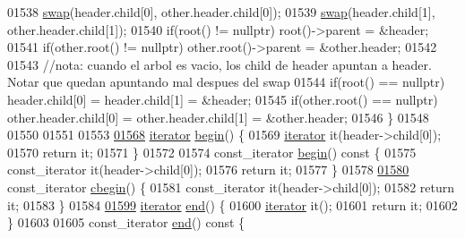 \begin{DoxyCode}
01538         \hyperlink{namespaceaed2_ab24ac4be44835194ce27a61969e4a292_ab24ac4be44835194ce27a61969e4a292}{swap}(header.child[0], other.header.child[0]);
01539         \hyperlink{namespaceaed2_ab24ac4be44835194ce27a61969e4a292_ab24ac4be44835194ce27a61969e4a292}{swap}(header.child[1], other.header.child[1]);
01540         \textcolor{keywordflow}{if}(root() != \textcolor{keyword}{nullptr}) root()->parent = &header;
01541         \textcolor{keywordflow}{if}(other.root() != \textcolor{keyword}{nullptr}) other.root()->parent = &other.header;
01542 
01543         \textcolor{comment}{//nota: cuando el arbol es vacio, los child de header apuntan a header.  Notar que quedan apuntando
       mal despues del swap}
01544         \textcolor{keywordflow}{if}(root() == \textcolor{keyword}{nullptr}) header.child[0] = header.child[1] = &header;
01545         \textcolor{keywordflow}{if}(other.root() == \textcolor{keyword}{nullptr}) other.header.child[0] = other.header.child[1] = &other.header;
01546     \}
01548 
01550 
01551 
01553 
\hyperlink{namespaceaed2_a669d2fcf59e6ec1fe40105ba395768b6_a669d2fcf59e6ec1fe40105ba395768b6}{01568}     \hyperlink{classaed2_1_1iterator}{iterator} \hyperlink{namespaceaed2_a669d2fcf59e6ec1fe40105ba395768b6_a669d2fcf59e6ec1fe40105ba395768b6}{begin}() \{
01569         \hyperlink{classaed2_1_1iterator}{iterator} it(header->child[0]);
01570         \textcolor{keywordflow}{return} it;
01571     \}
01572 
01574     const\_iterator \hyperlink{namespaceaed2_a669d2fcf59e6ec1fe40105ba395768b6_a669d2fcf59e6ec1fe40105ba395768b6}{begin}()\textcolor{keyword}{ const }\{
01575         const\_iterator it(header->child[0]);
01576         \textcolor{keywordflow}{return} it;
01577     \}
01578 
\hyperlink{namespaceaed2_ac1c803de21070eb6f9b7fa3e2035bc22_ac1c803de21070eb6f9b7fa3e2035bc22}{01580}     const\_iterator \hyperlink{namespaceaed2_ac1c803de21070eb6f9b7fa3e2035bc22_ac1c803de21070eb6f9b7fa3e2035bc22}{cbegin}() \{
01581         const\_iterator it(header->child[0]);
01582         \textcolor{keywordflow}{return} it;
01583     \}
01584 
\hyperlink{namespaceaed2_a3a9c18730be5c97fa5eafebd3aef61ed_a3a9c18730be5c97fa5eafebd3aef61ed}{01599}     \hyperlink{classaed2_1_1iterator}{iterator} \hyperlink{namespaceaed2_a3a9c18730be5c97fa5eafebd3aef61ed_a3a9c18730be5c97fa5eafebd3aef61ed}{end}() \{
01600         \hyperlink{classaed2_1_1iterator}{iterator} it();
01601         \textcolor{keywordflow}{return} it;
01602     \}
01603 
01605     const\_iterator \hyperlink{namespaceaed2_a3a9c18730be5c97fa5eafebd3aef61ed_a3a9c18730be5c97fa5eafebd3aef61ed}{end}()\textcolor{keyword}{ const }\{

\end{DoxyCode}
